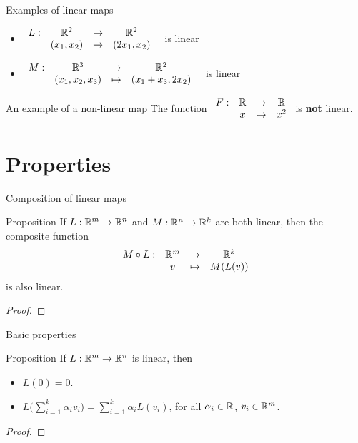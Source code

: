 \documentclass{beamer}
\begin{document}
\begin{frame}[t]{Examples of linear maps}
	\begin{itemize}
		\item $\displaystyle
			\begin{array}{cccc}
				L: & \mathbb{R}^2 & \to & \mathbb{R}^2 \\
				   & (x_1,x_2) & \mapsto & (2 x_1,x_2)
			\end{array}
			$
			\ is linear
			\vspace{2cm}
		\item
			$\displaystyle
			\begin{array}{cccc}
				M: & \mathbb{R}^3 & \to & \mathbb{R}^2 \\
				   & (x_1,x_2,x_3) & \mapsto & (x_1+x_3,2x_2)
			\end{array}
			$
			\ is linear
	\end{itemize}
\end{frame}
\begin{frame}[t]{An example of a non-linear map}
		The function \quad $\displaystyle
			\begin{array}{cccc}
				F: & \mathbb{R} & \to & \mathbb{R} \\
				   & x & \mapsto & x^2
			\end{array}
			$
			\quad is \textbf{not} linear.
\end{frame}

\section{Properties}

\begin{frame}[t]{Composition of linear maps}
	\begin{block}{Proposition}
		If $L: \mathbb{R}^m \to \mathbb{R}^n$ and $M: \mathbb{R}^n \to \mathbb{R}^k$ are both linear, then the composite function
		$$
			\begin{array}{cccc}
				M \circ L: & \mathbb{R}^m & \to & \mathbb{R}^k \\
						   & v & \mapsto & M(L(v))
			\end{array}
			$$
			is also linear.
	\end{block}
	\begin{proof}
		\vfill
		\vspace{2cm}
	\end{proof}
\end{frame}
\begin{frame}[t]{Basic properties}
	\begin{block}{Proposition}
		If $L: \mathbb{R}^m \to \mathbb{R}^n$ is linear, then
		\begin{itemize}
			\item $L(0) = 0$.
			\item $\displaystyle L\Big(\sum_{i=1}^k \alpha_i v_i \Big) = \sum_{i=1}^k \alpha_i L(v_i)$, for all $\alpha_i \in \mathbb{R}$, $v_i \in \mathbb{R}^m$.
		\end{itemize}
	\end{block}
	\begin{proof}
		\vfill
		\vspace{2cm}
	\end{proof}
\end{frame}
\end{document}
